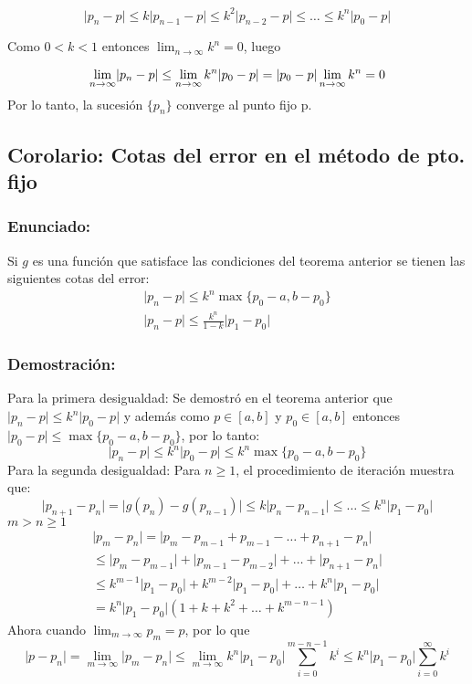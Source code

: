 \documentclass[a4paper,12pt]{article}
\begin{document}
\[
\lvert p_n-p\rvert \leq k \lvert p_{n-1}-p\rvert \leq k^2 \lvert p_{n-2}-p\rvert \leq \dots \leq k^n \lvert p_0-p\rvert
\]

Como $0<k<1$ entonces $\lim_{n \to \infty}k^n=0$, luego 

\[
\lim_{n \to \infty}\lvert p_n-p\rvert \leq \lim_{n \to \infty}k^n \lvert p_0-p\rvert \\
=  \lvert p_0-p\rvert\lim_{n \to \infty}k^n =0
\]
Por lo tanto, la sucesión $\{p_n\}$ converge al punto fijo p.

\subsection{Corolario: Cotas del error en el método de pto. fijo}
\subsubsection{Enunciado:}
Si $g$ es una función que satisface las condiciones del teorema anterior se tienen las siguientes cotas del error:
\begin{gather*}
    \lvert p_n-p\rvert \leq k^n \max\{p_0-a,b-p_0\} \\
    \lvert p_n-p\rvert \leq \frac{k^n}{1-k}\lvert p_1-p_0\rvert
\end{gather*}
\subsubsection{Demostración:}
Para la primera desigualdad: Se demostró en el teorema anterior que $\lvert p_n-p\rvert \leq k^n \lvert p_0-p \rvert$ y además como $p \in [a,b]$ y $p_0 \in [a,b]$ entonces $\lvert p_0-p\rvert \leq \max\{p_0-a,b-p_0\}$, por lo tanto:
\[
\lvert p_n-p\rvert \leq k^n \lvert p_0-p\rvert \leq k^n \max\{p_0-a,b-p_0\}
\]
Para la segunda desigualdad: Para $n\geq 1$, el procedimiento de iteración muestra que:
\[
    \lvert p_{n+1}-p_n \rvert = \lvert g(p_n)-g(p_{n-1})\rvert \leq k \lvert p_n - p_{n-1} \rvert \leq \dots \leq k^n \lvert p_1-p_0\rvert
\]
$m>n\geq 1$
\begin{gather*}
    \lvert p_m-p_n \rvert = \lvert p_m-p_{m-1} + p_{m-1}- \dots + p_{n+1}-p_n \rvert \\
    \leq \lvert p_m-p_{m-1} \rvert + \lvert p_{m-1}-p_{m-2} \rvert + \dots + \lvert p_{n+1}-p_n \rvert \\
    \leq k^{m-1} \lvert p_1-p_0\rvert + k^{m-2} \lvert p_1-p_0\rvert + \dots + k^n \lvert p_1-p_0\rvert \\ 
    = k^n \lvert p_1-p_0\rvert (1+k+k^2+\dots +k^{m-n-1}) 
\end{gather*}
Ahora cuando $\lim_{m \to \infty} p_m=p$, por lo que
\[
\lvert p-p_n\rvert=\lim_{m \to \infty}\lvert p_m-p_n\rvert \leq \lim_{m \to \infty} k^n \lvert p_1-p_0\rvert \sum_{i = 0}^{m-n-1} k^i\leq k^n \lvert p_1-p_0\rvert \sum_{i=0}^{\infty} k^i
\]
\end{document}
